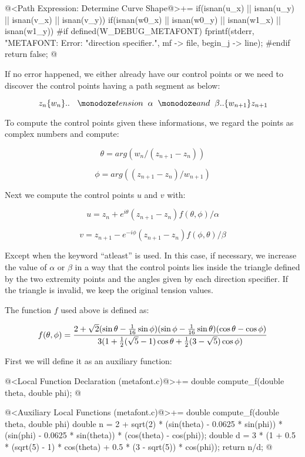 \iniciocodigo
@<Path Expression: Determine Curve Shape@>+=
if(isnan(u_x) || isnan(u_y) || isnan(v_x) ||  isnan(v_y)){
  if(isnan(w0_x) || isnan(w0_y) || isnan(w1_x) || isnan(w1_y)){
#if defined(W_DEBUG_METAFONT)
    fprintf(stderr, "METAFONT: Error: %
                    "direction specifier.\n",  mf -> file, begin_j -> line);
#endif
    return false;
  }
}
@
\fimcodigo

If no error happened, we either already have our control points or we
need to discover the control points having a path segment as below:

$$
z_n\{w_n\}..\ {\hskip2mm \monoespaco{tension}\hskip2mm } \alpha {\hskip2mm \monoespaco{and}\hskip2mm } \beta .. \{w_{n+1}\}z_{n+1}
$$

To compute the control points given these informations, we regard the
points as complex numbers and compute:

$$
\theta = arg(w_n/(z_{n+1}-z_n))
$$

$$
\phi = arg((z_{n+1}-z_n)/w_{n+1})
$$

Next we compute the control points $u$ and $v$ with:


$$
u = z_{n} + e^{i\theta}(z_{n+1}-z_n)f(\theta, \phi)/\alpha
$$

$$
v = z_{n+1} - e^{-i\phi}(z_{n+1}-z_n)f(\phi, \theta)/\beta
$$

Except when the keyword ``atleast'' is used. In this case, if
necessary, we increase the value of $\alpha$ or $\beta$ in a way that
the control points lies inside the triangle defined by the two
extremity points and the angles given by each direction specifier. If
the triangle is invalid, we keep the original tension values.

The function $f$ used above is defined as:

$$
f(\theta, \phi) = {{2+\sqrt{2}(\sin\theta-{{1}\over{16}}\sin\phi)(\sin\phi-{{1}\over{16}}\sin\theta)(\cos\theta-\cos\phi)}\over{3(1+{1\over 2}(\sqrt 5 - 1)\cos\theta+{1\over 2}(3-\sqrt 5)\cos\phi)}}
$$

First we will define it as an auxiliary function:

\iniciocodigo
@<Local Function Declaration (metafont.c)@>+=
double compute_f(double theta, double phi);
@
\fimcodigo

\iniciocodigo
@<Auxiliary Local Functions (metafont.c)@>+=
double compute_f(double theta, double phi){
  double n = 2 + sqrt(2) * (sin(theta) - 0.0625 * sin(phi)) *
             (sin(phi) - 0.0625 * sin(theta)) * (cos(theta) - cos(phi));
  double d = 3 * (1 + 0.5 * (sqrt(5) - 1) * cos(theta) + 0.5 * (3 - sqrt(5)) *
                  cos(phi));
  return n/d;
}
@
\fimcodigo

